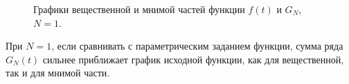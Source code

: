 \documentclass[a5paper, 10pt]{article}
\theoremstyle{definition}
\theoremstyle{plain}
\theoremstyle{remark}
\begin{document}
\begin{figure}[h]
\begin{minipage}[h]{0.5\linewidth}
\end{minipage}
\hfill
\begin{minipage}[h]{0.5\linewidth}
\end{minipage}
\caption{Графики вещественной и мнимой частей функции $f(t)$ и $G_N$, $N=1$.}
\end{figure}

При $N = 1$, если сравнивать с параметрическим заданием функции, сумма ряда $G_N(t)$ сильнее приближает график исходной функции, как для вещественной, так и для мнимой части.
\end{document}

